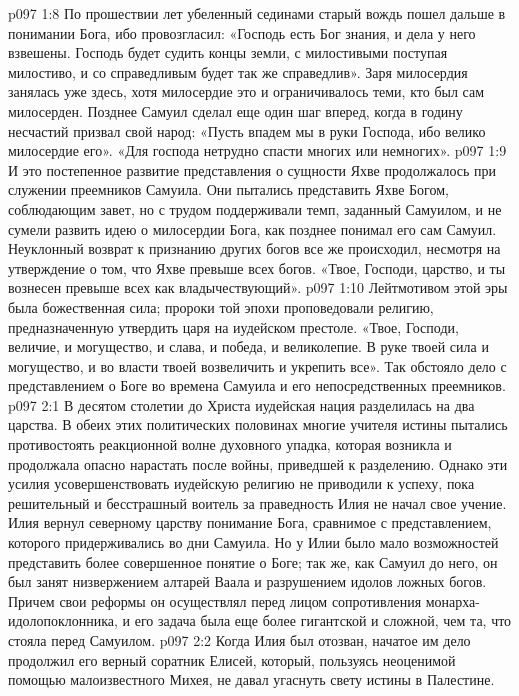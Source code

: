 \vs p097 1:8 По прошествии лет убеленный сединами старый вождь пошел дальше в понимании Бога, ибо провозгласил: «Господь есть Бог знания, и дела у него взвешены. Господь будет судить концы земли, с милостивыми поступая милостиво, и со справедливым будет так же справедлив». Заря милосердия занялась уже здесь, хотя милосердие это и ограничивалось теми, кто был сам милосерден. Позднее Самуил сделал еще один шаг вперед, когда в годину несчастий призвал свой народ: «Пусть впадем мы в руки Господа, ибо велико милосердие его». «Для господа нетрудно спасти многих или немногих».
\vs p097 1:9 \pc И это постепенное развитие представления о сущности Яхве продолжалось при служении преемников Самуила. Они пытались представить Яхве Богом, соблюдающим завет, но с трудом поддерживали темп, заданный Самуилом, и не сумели развить идею о милосердии Бога, как позднее понимал его сам Самуил. Неуклонный возврат к признанию других богов все же происходил, несмотря на утверждение о том, что Яхве превыше всех богов. «Твое, Господи, царство, и ты вознесен превыше всех как владычествующий».
\vs p097 1:10 Лейтмотивом этой эры была божественная сила; пророки той эпохи проповедовали религию, предназначенную утвердить царя на иудейском престоле. «Твое, Господи, величие, и могущество, и слава, и победа, и великолепие. В руке твоей сила и могущество, и во власти твоей возвеличить и укрепить все». Так обстояло дело с представлением о Боге во времена Самуила и его непосредственных преемников.
\vs p097 2:1 В десятом столетии до Христа иудейская нация разделилась на два царства. В обеих этих политических половинах многие учителя истины пытались противостоять реакционной волне духовного упадка, которая возникла и продолжала опасно нарастать после войны, приведшей к разделению. Однако эти усилия усовершенствовать иудейскую религию не приводили к успеху, пока решительный и бесстрашный воитель за праведность Илия не начал свое учение. Илия вернул северному царству понимание Бога, сравнимое с представлением, которого придерживались во дни Самуила. Но у Илии было мало возможностей представить более совершенное понятие о Боге; так же, как Самуил до него, он был занят низвержением алтарей Ваала и разрушением идолов ложных богов. Причем свои реформы он осуществлял перед лицом сопротивления монарха\hyp{}идолопоклонника, и его задача была еще более гигантской и сложной, чем та, что стояла перед Самуилом.
\vs p097 2:2 Когда Илия был отозван, начатое им дело продолжил его верный соратник Елисей, который, пользуясь неоценимой помощью малоизвестного Михея, не давал угаснуть свету истины в Палестине.
